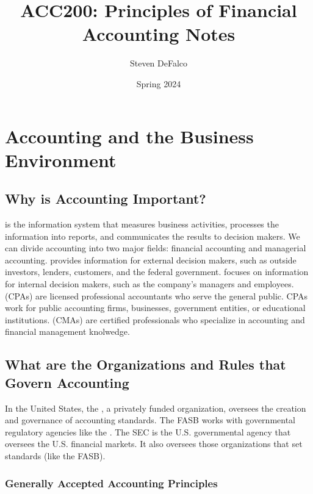 \documentclass{article}
\title{ACC200: Principles of Financial Accounting Notes}
\author{Steven DeFalco}
\date{Spring 2024}
\begin{document}
\maketitle
\tableofcontents
\newpage


\section{Accounting and the Business Environment}

\subsection{Why is Accounting Important?}

 is the information system that measures business activities, processes the information into reports, and communicates the results to decision makers. We can divide accounting into two major fields: financial accounting and managerial accounting.  provides information for external decision makers, such as outside investors, lenders, customers, and the federal government.  focuses on information for internal decision makers, such as the company's managers and employees. \\ 

 (CPAs) are licensed professional accountants who serve the general public. CPAs work for public accounting firms, businesses, government entities, or educational institutions.  (CMAs) are certified professionals who specialize in accounting and financial management knolwedge. 

\subsection{What are the Organizations and Rules that Govern Accounting}

In the United States, the , a privately funded organization, oversees the creation and governance of accounting standards. The FASB works with governmental regulatory agencies like the . The SEC is the U.S. governmental agency that oversees the U.S. financial markets. It also oversees those organizations that set standards (like the FASB).  \\ 

\subsubsection{Generally Accepted Accounting Principles}
\end{document}
